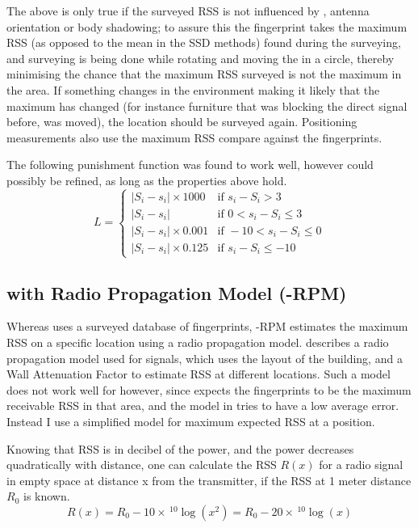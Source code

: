 The above is only true if the surveyed RSS is not influenced by \mpi, antenna orientation or body shadowing; to assure this the fingerprint takes the maximum RSS (as opposed to the mean in the SSD methods) found during the surveying, and surveying is being done while rotating and moving the \device in a circle, thereby minimising the chance that the maximum RSS surveyed is not the maximum in the area.
If something changes in the environment making it likely that the maximum has changed (for instance furniture that was blocking the direct signal before, was moved), the location should be surveyed again.
Positioning measurements also use the maximum RSS compare against the fingerprints.

The following punishment function was found to work well, however could possibly be refined, as long as the properties above hold.
\begin{equation}
    L = \begin{cases}
        |S_i - s_i| \times 1000     & \text{if } s_i - S_i > 3 \\
        |S_i - s_i|                 & \text{if } 0 < s_i -S_i \leq 3 \\
        |S_i - s_i| \times 0.001    & \text{if } -10 < s_i-S_i \leq 0 \\
        |S_i - s_i| \times 0.125    & \text{if } s_i-S_i \leq -10 
    \end{cases}
    \label{eq:architecture-BRP-punishment}
\end{equation}

\subsection{\BRP with Radio Propagation Model (\aBRP-RPM)}
Whereas \aBRP uses a surveyed database of fingerprints, \aBRP-RPM estimates the maximum RSS on a specific location using a radio propagation model.
\citet{bahl2000radar} describes a radio propagation model used for \wifi signals, which uses the layout of the building, and a Wall Attenuation Factor to estimate RSS at different locations.
Such a model does not work well for \aBRP however, since \aBRP expects the fingerprints to be the maximum receivable RSS in that area, and the model in \citet{bahl2000radar} tries to have a low average error.
Instead I use a simplified model for maximum expected RSS at a position.

Knowing that RSS is in decibel of the power, and the power decreases quadratically with distance, one can calculate the RSS $R(x)$ for a radio signal in empty space at distance x from the transmitter, if the RSS at 1 meter distance $R_0$ is known.
\begin{equation}
    R(x) = R_0 - 10 \times \, ^{10}\log(x^2) = R_0 - 20 \times \, ^{10}\log(x)
\end{equation}

